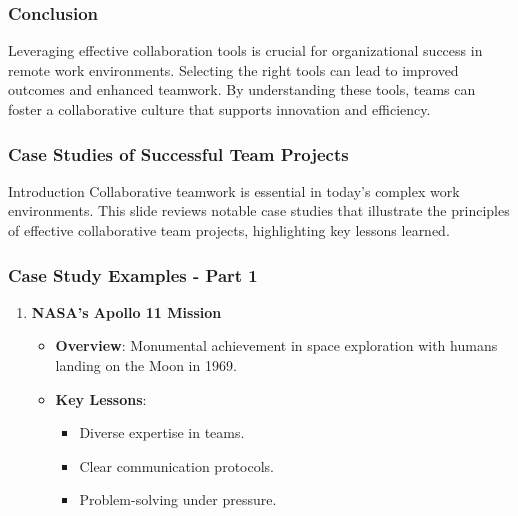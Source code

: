 \documentclass[aspectratio=169]{beamer}
\begin{document}
\begin{frame}[fragile]
    \frametitle{Conclusion}
    Leveraging effective collaboration tools is crucial for organizational success in remote work environments. Selecting the right tools can lead to improved outcomes and enhanced teamwork. By understanding these tools, teams can foster a collaborative culture that supports innovation and efficiency.
\end{frame}

\begin{frame}[fragile]
    \frametitle{Case Studies of Successful Team Projects}
    \begin{block}{Introduction}
        Collaborative teamwork is essential in today’s complex work environments. This slide reviews notable case studies that illustrate the principles of effective collaborative team projects, highlighting key lessons learned.
    \end{block}
\end{frame}

\begin{frame}[fragile]
    \frametitle{Case Study Examples - Part 1}
    \begin{enumerate}
        \item \textbf{NASA's Apollo 11 Mission}
        \begin{itemize}
            \item \textbf{Overview}: Monumental achievement in space exploration with humans landing on the Moon in 1969.
            \item \textbf{Key Lessons}:
            \begin{itemize}
                \item Diverse expertise in teams.
                \item Clear communication protocols.
                \item Problem-solving under pressure.
            \end{itemize}
        \end{itemize}
    \end{enumerate}
\end{frame}
\end{document}
